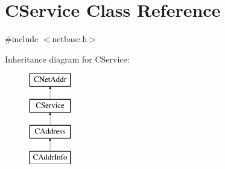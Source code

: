 \hypertarget{class_c_service}{}\section{C\+Service Class Reference}
\label{class_c_service}


{\ttfamily \#include $<$netbase.\+h$>$}

Inheritance diagram for C\+Service\+:\begin{figure}[H]
\begin{center}
\leavevmode
\includegraphics[height=4.000000cm]{class_c_service}
\end{center}
\end{figure}
